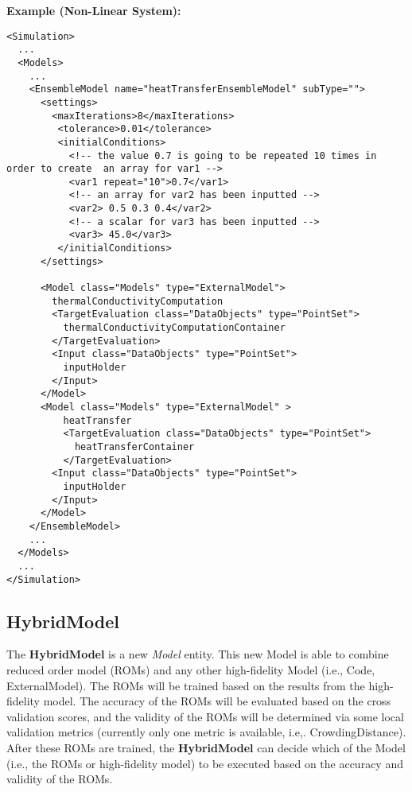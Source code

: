 \textbf{Example (Non-Linear System):}
\begin{lstlisting}[style=XML,morekeywords={subType,debug,repeat,name,class,type}]
<Simulation>
  ...
  <Models>
    ...
    <EnsembleModel name="heatTransferEnsembleModel" subType="">
      <settings>
        <maxIterations>8</maxIterations>
         <tolerance>0.01</tolerance>
         <initialConditions>
           <!-- the value 0.7 is going to be repeated 10 times in order to create  an array for var1 -->
           <var1 repeat="10">0.7</var1>
           <!-- an array for var2 has been inputted -->
           <var2> 0.5 0.3 0.4</var2>
           <!-- a scalar for var3 has been inputted -->
           <var3> 45.0</var3>
         </initialConditions>
      </settings>

      <Model class="Models" type="ExternalModel">
        thermalConductivityComputation
        <TargetEvaluation class="DataObjects" type="PointSet">
          thermalConductivityComputationContainer
        </TargetEvaluation>
        <Input class="DataObjects" type="PointSet">
          inputHolder
        </Input>
      </Model>
      <Model class="Models" type="ExternalModel" >
          heatTransfer
          <TargetEvaluation class="DataObjects" type="PointSet">
            heatTransferContainer
          </TargetEvaluation>
        <Input class="DataObjects" type="PointSet">
          inputHolder
        </Input>
      </Model>
    </EnsembleModel>
    ...
  </Models>
  ...
</Simulation>
\end{lstlisting}


%
%

\subsection{HybridModel}
\label{subsec:models_HybridModel}
The \textbf{HybridModel} is a new \textit{Model} entity. This new Model is able to combine reduced order model
(ROMs) and any other high-fidelity Model (i.e., Code, ExternalModel). The ROMs will be trained based on the results
from the high-fidelity model. The accuracy of the ROMs will be evaluated based on the cross validation scores,
and the validity of the ROMs will be determined via some local validation metrics (\nb currently only one metric
is available, i.e,. CrowdingDistance). After these ROMs are trained, the \textbf{HybridModel} can decide which of
the Model (i.e., the ROMs or high-fidelity model) to be executed based on the accuracy and validity of the ROMs.

